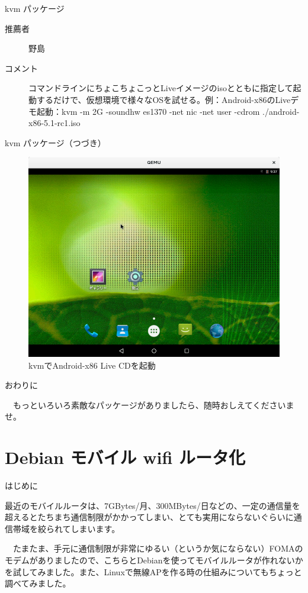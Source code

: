 \begin{frame}{kvm パッケージ}

  \begin{description}
    \item [推薦者] 野島
  　\item [コメント] コマンドラインにちょこちょこっとLiveイメージのisoとともに指定して起動するだけで、仮想環境で様々なOSを試せる。例：Android-x86のLiveデモ起動：kvm -m 2G -soundhw es1370 -net nic -net user -cdrom ./android-x86-5.1-rc1.iso
  \end{description}

\end{frame}

\begin{frame}{kvm パッケージ（つづき）}

\begin{figure}[htbp]
\includegraphics[width=0.8\hsize]{image201512/kvm.png}
\caption{kvmでAndroid-x86 Live CDを起動}
\end{figure}
  
\end{frame}

\begin{frame}{おわりに}

　もっといろいろ素敵なパッケージがありましたら、随時おしえてくださいませ。
  
\end{frame}

\section{Debian モバイル wifi ルータ化}

\begin{frame}{はじめに}

 最近のモバイルルータは、7GBytes/月、300MBytes/日などの、一定の通信量を超えるとたちまち通信制限がかかってしまい、とても実用にならないぐらいに通信帯域を絞られてしまいます。
  
　たまたま、手元に通信制限が非常にゆるい（というか気にならない）FOMAのモデムがありましたので、こちらとDebianを使ってモバイルルータが作れないかを試してみました。また、Linuxで無線APを作る時の仕組みについてもちょっと調べてみました。
 
\end{frame}

